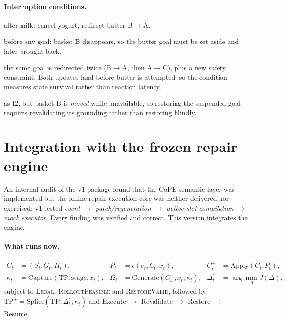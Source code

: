 \documentclass[11pt]{article}
\begin{document}
\paragraph{Interruption conditions.}
\begin{description}[leftmargin=1.4em,style=nextline]
\item[I1 --- cancellation + redirection] after milk: cancel yogurt, redirect
butter B$\to$A.
\item[I2 --- temporary unavailability] before any goal: basket B disappears, so
the butter goal must be set aside and later brought back.
\item[I3 --- repeated interruption] the same goal is redirected twice
(B$\to$A, then A$\to$C), plus a new safety constraint. Both updates land before
butter is attempted, so the condition measures state survival rather than
reaction latency.
\item[I4 --- changed-world restoration] as I2, but basket B is \emph{moved}
while unavailable, so restoring the suspended goal requires revalidating its
grounding rather than restoring blindly.
\end{description}

\section{Integration with the frozen repair engine}

An internal audit of the v1 package found that the CoPE semantic layer was
implemented but the online-repair execution core was neither delivered nor
exercised: v1 tested \emph{event $\to$ patch/regeneration $\to$ active-slot
compilation $\to$ mock executor}. Every finding was verified and correct. This
version integrates the engine.

\paragraph{What runs now.}
\[
\begin{aligned}
C_t &= (S_t, G_t, H_t), &
P_t &= \epsilon(e_t, C_t, x_t), &
C_t^{+} &= \mathrm{Apply}(C_t, P_t),\\
\kappa_t &= \mathrm{Capture}(\mathrm{TP}, \text{stage}, x_t), &
\Omega_t &= \mathrm{Generate}(C_t^{+}, x_t, \kappa_t), &
\Delta_t^{*} &= \arg\min_{\Delta} J(\Delta),
\end{aligned}
\]
subject to \textsc{Legal}, \textsc{RolloutFeasible} and \textsc{RestoreValid},
followed by $\mathrm{TP}^{+} = \mathrm{Splice}(\mathrm{TP}, \Delta_t^{*},
\kappa_t)$ and Execute $\to$ Revalidate $\to$ Restore $\to$ Resume.
\end{document}
